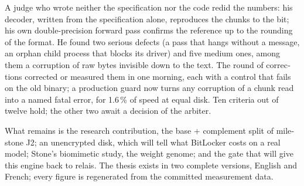 \begin{otherlanguage}{english}
A judge who wrote neither the specification nor the code redid the numbers: his decoder, written from the specification alone, reproduces the chunks to the bit; his own double-precision forward pass confirms the reference up to the rounding of the format. He found two serious defects (a pass that hangs without a message, an orphan child process that blocks its driver) and five medium ones, among them a corruption of raw bytes invisible down to the text. The round of corrections corrected or measured them in one morning, each with a control that fails on the old binary; a production guard now turns any corruption of a chunk read into a named fatal error, for 1.6\,\% of speed at equal disk. Ten criteria out of twelve hold; the other two await a decision of the arbiter.

What remains is the research contribution, the base + complement split of milestone J2; an unencrypted disk, which will tell what BitLocker costs on a real model; Stone's biomimetic study, the weight genome; and the gate that will give this engine back to relais. The thesis exists in two complete versions, English and French; every figure is regenerated from the committed measurement data.
\end{otherlanguage}

